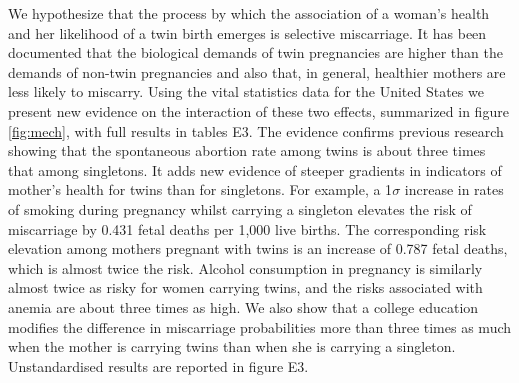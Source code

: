 \documentclass{nature}
\begin{document}
\begin{linenumbers}
We hypothesize that the process by which the association of a woman's health and her likelihood of a twin birth emerges is selective miscarriage. It has been documented that the biological demands of twin pregnancies are higher than the demands of non-twin pregnancies\cite{Shinagawaetal2005,Kahnetal2003} and also that, in general, healthier mothers are less likely to miscarry\cite{Garciaetal2002}. Using the vital statistics data for the United States we present new evidence on the interaction of these two effects, summarized in figure \ref{fig:mech}, with full results in tables E3. %
The evidence confirms previous research showing that the spontaneous abortion rate among twins is about three times that among singletons\cite{Boklage1990}. It adds new evidence of steeper gradients in indicators of mother's health for twins than for singletons. For example, a 1$\sigma$ increase in rates of smoking during pregnancy whilst carrying a singleton elevates the risk of miscarriage by 0.431 fetal deaths per 1,000 live births.
The corresponding risk elevation among mothers pregnant with twins is an increase of 0.787 fetal deaths, which is almost twice the risk.
Alcohol consumption in pregnancy is similarly almost twice as risky for women carrying twins, and the risks associated with anemia are about three times as high. We also show that a college education modifies the difference in miscarriage probabilities more than three times as much when the mother is carrying twins than when she is carrying a singleton.  Unstandardised results are reported in figure E3.



\end{linenumbers}
\end{document}
